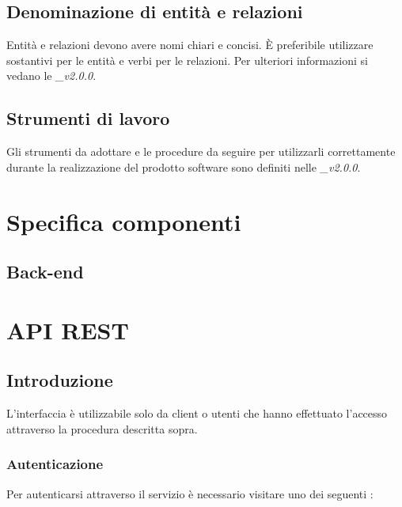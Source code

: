 \documentclass[12pt,a4paper]{article}
\begin{document}

\subsection{Denominazione di entità e relazioni}
Entità e relazioni devono avere nomi chiari e concisi. È preferibile utilizzare sostantivi
per le entità e verbi per le relazioni. Per ulteriori informazioni si vedano
le \textit{\NdP\_v2.0.0}.

\subsection{Strumenti di lavoro}
Gli strumenti da adottare e le procedure da seguire per utilizzarli correttamente durante la realizzazione 
del prodotto software sono definiti nelle \textit{\NdP\_v2.0.0}.

\newpage
\section{Specifica componenti}

\subsection{Back-end}

\section{API REST}

	\subsection{Introduzione}

		L'interfaccia  è utilizzabile solo da client o utenti che hanno effettuato l'accesso
		attraverso la procedura descritta sopra.

		\subsubsection{Autenticazione}

			Per autenticarsi attraverso il servizio è necessario visitare uno dei seguenti :
\end{document}
